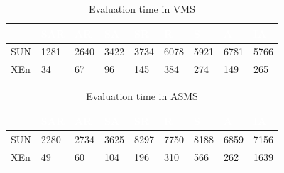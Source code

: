 \begin{table}[h!]
\centering
\begin{tabular}{|l|l|l|l|l|l|l|l|l|}   
\hline  \rowcolor{black} \scriptsize \bf \textcolor {white}{}
& \scriptsize \bf \textcolor {white}{SAR}
& \scriptsize \bf \textcolor {white}{AR}
& \scriptsize \bf \textcolor  {white}{SA}
& \scriptsize \bf \textcolor  {white}{SR}
& \scriptsize \bf \textcolor  {white}{R}

& \scriptsize \bf \textcolor  {white}{S} 
& \scriptsize \bf \textcolor  {white}{A}

& \scriptsize \bf \textcolor {white}{IA}\\ \hline

\scriptsize  {SUN }
& \scriptsize  {1281}
& \scriptsize {2640}
& \scriptsize {3422}
& \scriptsize {3734}
& \scriptsize {6078}

& \scriptsize {5921}
& \scriptsize {6781}
& \scriptsize {5766}
  \\ \hline
\scriptsize  {XEn}
& \scriptsize  {34}
& \scriptsize {67}
& \scriptsize {96}
& \scriptsize {145}
& \scriptsize {384}

& \scriptsize {274}
& \scriptsize {149}
& \scriptsize {265}
  \\ \hline
\end{tabular}
\caption{Evaluation time in VMS}\end{table}

\begin{table}[h!]
\centering
\begin{tabular}{|l|l|l|l|l|l|l|l|l|}   
\hline  \rowcolor{black} \scriptsize \bf \textcolor {white}{}
& \scriptsize \bf \textcolor {white}{SAR}
& \scriptsize \bf \textcolor {white}{AR}
& \scriptsize \bf \textcolor  {white}{SA}
& \scriptsize \bf \textcolor  {white}{SR}
& \scriptsize \bf \textcolor  {white}{R}

& \scriptsize \bf \textcolor  {white}{S} 
& \scriptsize \bf \textcolor  {white}{A}
& \scriptsize \bf \textcolor {white}{IA}\\ \hline
\scriptsize  {SUN }
& \scriptsize  {2280}
& \scriptsize {2734}
& \scriptsize {3625}
& \scriptsize {8297}
& \scriptsize {7750}

& \scriptsize {8188}
& \scriptsize {6859}
& \scriptsize {7156}
  \\ \hline
\scriptsize  {XEn}
& \scriptsize  {49}
& \scriptsize {60}
& \scriptsize {104}
& \scriptsize {196}
& \scriptsize {310}

& \scriptsize {566}
& \scriptsize {262}
& \scriptsize {1639}
  \\ \hline
\end{tabular}
\caption{Evaluation time in ASMS}\end{table}


